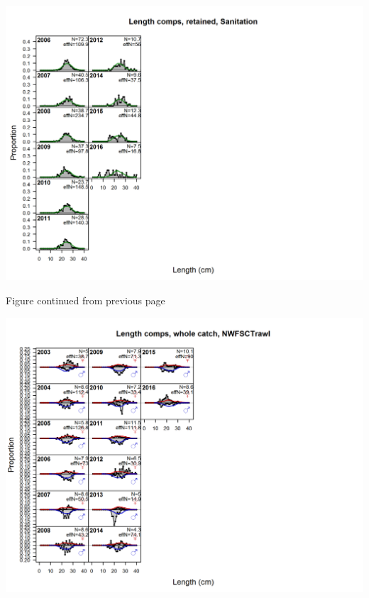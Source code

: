 \documentclass[ignorenonframetext,compress]{beamer}
\begin{document}
\includegraphics{./r4ss/plots_mod1/comp_lenfit_flt7mkt2_page2.png}

\begin{center} 

              Figure continued from previous page 

             \end{center}

\includegraphics{./r4ss/plots_mod1/comp_lenfit_flt8mkt0.png}
\end{document}

